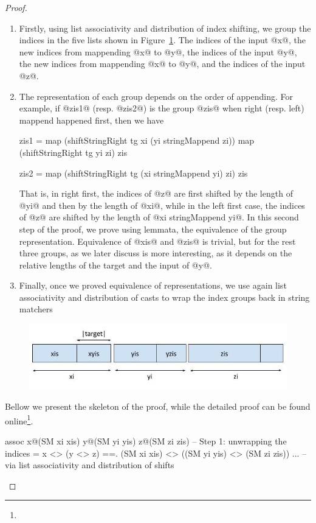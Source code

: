 \begin{proof}
\begin{enumerate}
\item Firstly, using list associativity and distribution of index shifting,
we group the indices in the five lists shown in Figure~\ref{fig:mappend:assoc}.
The indices of the input @x@,
the new indices from mappending @x@ to @y@,
the indices of the input @y@,
the new indices from mappending @x@ to @y@, and
the indices of the input @z@.
\item The representation of each group depends on the order of appending.
For example, if @zis1@ (resp. @zis2@) is the group @zis@ when
right (resp. left) mappend happened first, then we have
\begin{code}
zis1 = map (shiftStringRight tg xi (yi stringMappend zi))
       map (shiftStringRight tg yi zi) zis

zis2 = map (shiftStringRight tg (xi stringMappend yi) zi) zis
\end{code}
That is, in right first, the indices of @z@ are first shifted
by the length of @yi@ and then by the length of @xi@,
while in the left first case, the indices of @z@ are shifted by the
length of @xi stringMappend yi@.
In this second step of the proof, we prove using lemmata,
the equivalence of the group representation.
Equivalence of @xis@ and @zis@ is trivial,
but for the rest three groups, as we later discuss is more interesting,
as it depends on the relative lengths of the target and the input of @y@.
\item Finally, once we proved equivalence of representations,
we use again list associativity and distribution of casts to wrap the index groups
back in string matchers
\end{enumerate}
\begin{figure}
\includegraphics[scale=0.5]{AssociativeIndices}
\label{fig:mappend:assoc}
\end{figure}
Bellow we present the skeleton of the proof, while the detailed proof can be found online\footnote{}.
\begin{code}
assoc x@(SM xi xis) y@(SM yi yis) z@(SM zi zis)
  -- Step 1: unwrapping the indices
  =   x <> (y <> z)
  ==. (SM xi xis) <> ((SM yi yis) <> (SM zi zis))
                         ...
  -- via list associativity and distribution of shifts


\end{code}
\end{proof}

